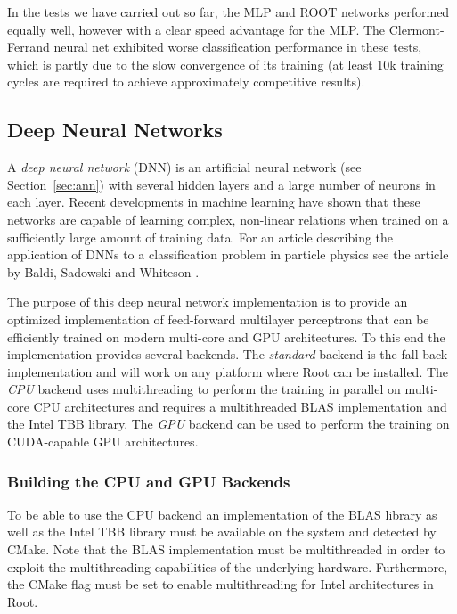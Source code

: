 In the tests we have carried out so far, the MLP and ROOT networks performed equally well,
however with a clear speed advantage for the MLP. The Clermont-Ferrand neural net
exhibited worse classification performance in these tests, which is partly due to the slow
convergence of its training (at least 10k training cycles are required to achieve
approximately competitive results).

\subsection{Deep Neural Networks }
\label {sec:dnn}

A \textit{deep neural network} (DNN) is an artificial neural network
(see Section~\ref{sec:ann}) with several hidden layers and a large
number of neurons in each layer. Recent developments in machine
learning have shown that these networks are capable of learning
complex, non-linear relations when trained on a sufficiently large
amount of training data. For an article describing the application of
DNNs to a classification problem in particle physics see the article
by Baldi, Sadowski and Whiteson \cite{higgs_dnn}.

The purpose of this deep neural network implementation is to provide
an optimized implementation of feed-forward multilayer perceptrons
that can be efficiently trained on modern multi-core and GPU
architectures. To this end the implementation provides several
backends. The \textit{standard} backend is the fall-back
implementation and will work on any platform where Root can be
installed. The \textit{CPU} backend uses multithreading to perform
the training in parallel on multi-core CPU architectures and requires
a multithreaded BLAS implementation and the Intel TBB library. The
\textit{GPU} backend can be used to perform the training on
CUDA-capable GPU architectures.

\subsubsection{Building the CPU and GPU Backends}

To be able to use the CPU backend an implementation of the BLAS
library as well as the Intel TBB library must be available on the
system and detected by CMake. Note that the BLAS implementation must be
multithreaded in order to exploit the multithreading capabilities of
the underlying hardware. Furthermore, the  CMake flag must be set
to enable multithreading for Intel architectures in Root.

